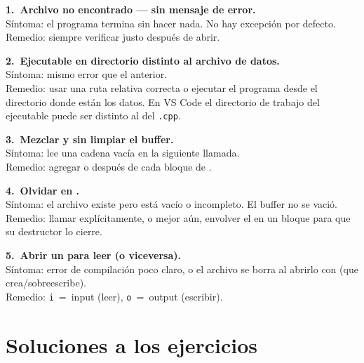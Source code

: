 \documentclass[12pt, oneside]{article}
\begin{document}
\begin{notaprofesor}

  \textbf{1.\ Archivo no encontrado — sin mensaje de error.}\\
  Síntoma: el programa termina sin hacer nada.  No hay excepción por defecto.\\
  Remedio: siempre verificar  justo después de abrir.

  \vspace{0.5em}
  \textbf{2.\ Ejecutable en directorio distinto al archivo de datos.}\\
  Síntoma: mismo error que el anterior.\\
  Remedio: usar una ruta relativa correcta o ejecutar el programa desde
  el directorio donde están los datos.  En VS Code el directorio de trabajo
  del ejecutable puede ser distinto al del \texttt{.cpp}.

  \vspace{0.5em}
  \textbf{3.\ Mezclar \cpp{>>} y  sin limpiar el buffer.}\\
  Síntoma:  lee una cadena vacía en la siguiente llamada.\\
  Remedio: agregar  o 
  después de cada bloque de \cpp{>>}.

  \vspace{0.5em}
  \textbf{4.\ Olvidar  en .}\\
  Síntoma: el archivo existe pero está vacío o incompleto.  El buffer no
  se vació.\\
  Remedio: llamar  explícitamente, o mejor aún, envolver el
   en un bloque \cpp{\{\}} para que su destructor lo cierre.

  \vspace{0.5em}
  \textbf{5.\ Abrir un  para leer (o viceversa).}\\
  Síntoma: error de compilación poco claro, o el archivo se borra al abrirlo
  con  (que crea/sobreescribe).\\
  Remedio: \texttt{i}~=~input (leer), \texttt{o}~=~output (escribir).

\end{notaprofesor}

\section{Soluciones a los ejercicios}
\end{document}
